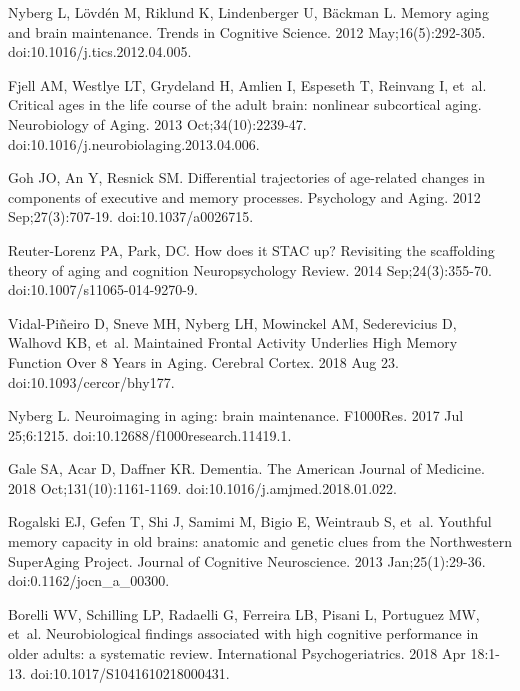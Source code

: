 \documentclass[10pt,letterpaper]{article}
\begin{document}
\begin{thebibliography}{10}

Nyberg L, L{\"o}vd{\'e}n M, Riklund K, Lindenberger U, B{\"a}ckman L.
\newblock Memory aging and brain maintenance.
\newblock Trends in Cognitive Science. 2012 May;16(5):292-305. doi:10.1016/j.tics.2012.04.005. 

Fjell AM, Westlye LT, Grydeland H, Amlien I, Espeseth T, Reinvang I, et~al.
\newblock Critical ages in the life course of the adult brain: nonlinear
  subcortical aging.
\newblock Neurobiology of Aging. 2013 Oct;34(10):2239-47. doi:10.1016/j.neurobiolaging.2013.04.006.

Goh JO, An Y, Resnick SM.
\newblock Differential trajectories of age-related changes in components of
  executive and memory processes.
\newblock Psychology and Aging. 2012 Sep;27(3):707-19. doi:10.1037/a0026715. 

Reuter-Lorenz PA, Park, DC. 
\newblock How does it STAC up? Revisiting the scaffolding theory of aging and cognition
\newblock Neuropsychology Review. 2014 Sep;24(3):355-70. 
doi:10.1007/s11065-014-9270-9.



Vidal-Pi{\~{n}}eiro D, Sneve MH, Nyberg LH, Mowinckel AM, Sederevicius D, Walhovd KB, et~al.
\newblock Maintained Frontal Activity Underlies High Memory Function Over 8
  Years in Aging.
\newblock Cerebral Cortex. 2018 Aug 23. doi:10.1093/cercor/bhy177.

Nyberg L.
\newblock Neuroimaging in aging: brain maintenance.
\newblock F1000Res. 2017 Jul 25;6:1215. doi:10.12688/f1000research.11419.1.
  
Gale SA, Acar D, Daffner KR.
\newblock Dementia.
\newblock The American Journal of Medicine. 2018 Oct;131(10):1161-1169. doi:10.1016/j.amjmed.2018.01.022. 

Rogalski EJ, Gefen T, Shi J, Samimi M, Bigio E, Weintraub S, et~al.
\newblock Youthful memory capacity in old brains: anatomic and genetic clues
  from the Northwestern SuperAging Project.
\newblock Journal of Cognitive Neuroscience. 2013 Jan;25(1):29-36. doi:0.1162/jocn\_a\_00300.

Borelli WV, Schilling LP, Radaelli G, Ferreira LB, Pisani L, Portuguez MW, et~al.
\newblock Neurobiological findings associated with high cognitive performance
  in older adults: a systematic review.
\newblock International Psychogeriatrics. 2018 Apr 18:1-13. doi:10.1017/S1041610218000431.


\end{thebibliography}
\end{document}
